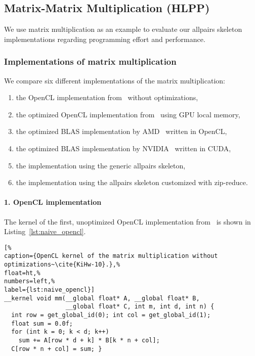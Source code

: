 \subsection{Matrix-Matrix Multiplication (HLPP)}

We use matrix multiplication as an example to evaluate our allpairs skeleton implementations regarding programming effort and performance.


\subsubsection{Implementations of matrix multiplication}
We compare six different implementations of the matrix multiplication:
\begin{enumerate}
  \item the OpenCL implementation from~\cite{KiHw-10} without optimizations,
  \item the optimized OpenCL implementation from~\cite{KiHw-10} using GPU local memory,
  \item the optimized BLAS implementation by AMD~\cite{AMD-13} written in OpenCL,
  \item the optimized BLAS implementation by NVIDIA~\cite{NVIDIA-13} written in CUDA,
  \item the implementation using the generic allpairs skeleton,
  \item the implementation using the allpairs skeleton customized with zip-reduce.
\end{enumerate}

\paragraph{1. OpenCL implementation}
The kernel of the first, unoptimized OpenCL implementation from~\cite{KiHw-10} is shown in Listing~\ref{lst:naive_opencl}.
\begin{lstlisting}[%                                                             
caption={OpenCL kernel of the matrix multiplication without optimizations~\cite{KiHw-10}.},%
float=ht,%
numbers=left,%
label={lst:naive_opencl}]
__kernel void mm(__global float* A, __global float* B,
                 __global float* C, int m, int d, int n) {
  int row = get_global_id(0); int col = get_global_id(1);
  float sum = 0.0f;
  for (int k = 0; k < d; k++)
    sum += A[row * d + k] * B[k * n + col];
  C[row * n + col] = sum; }
\end{lstlisting}

\vspace{-.5em}
